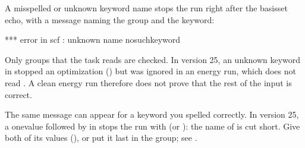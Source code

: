 \documentclass[letterpaper,10pt,english,openany,oneside]{sphinxmanual}
\begin{document}
\sphinxAtStartPar
A misspelled or unknown keyword name stops the run right after the basis\sphinxhyphen{}set echo, with a message naming the group
and the keyword:

\begin{sphinxVerbatim}[commandchars=\\\{\}]
*** error in \PYGZsq{}\PYGZdl{}scf\PYGZsq{} : unknown name nosuchkeyword
\end{sphinxVerbatim}



\sphinxAtStartPar
Only groups that the task reads are checked. In version 25, an unknown keyword in  stopped an
optimization () but was ignored in an energy run, which does not read . A
clean energy run therefore does not prove that the rest of the input is correct.



\sphinxAtStartPar
The same message can appear for a keyword you spelled correctly. In version 25, a one\sphinxhyphen{}value  followed
by  in  stops the run with  (or ): the name of  is
cut short. Give  both of its values (), or put it last in the group; see
{\hyperref[\detokenize{troubleshooting/common-problems:troubleshooting-scf-parser}]{}}.
\end{document}

